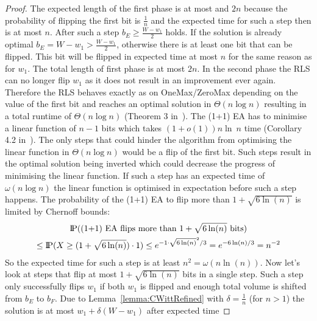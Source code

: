 \begin{proof}
    The expected length of the first phase is at most
    and $2n$ because the probability of flipping the first bit is $\frac{1}{n}$ and the expected time for such a step then is at most $n$.
    After such a step $b_E \ge \frac {W-w_1}{2}$ holds.
    If the solution is already optimal $b_E = W-w_1>\frac {W-w_1}{2}$, otherwise there is at least one bit that can be flipped.
    This bit will be flipped in expected time at most $n$ for the same reason as for $w_1$.
    The total length of first phase is at most $2n$.
    In the second phase the RLS can no longer flip $w_1$ as it does not result in an improvement ever again.
    Therefore the RLS behaves exactly as on OneMax/ZeroMax depending on the value of the first bit and reaches an optimal solution in $\Theta(n\log{}n)$ resulting in a total runtime of $\Theta(n\log{}n)$ (Theorem 3 in~\cite{witt2014fitness}).\newline
    The (1+1) EA has to minimise a linear function of $n-1$ bits which takes $(1+o(1))n\ln~n$ time (Corollary 4.2 in~\cite{witt2013tight}).
    The only steps that could hinder the algorithm from optimising the linear function in $\Theta(n\log{}n)$ would be a flip of the first bit.
    Such steps result in the optimal solution being inverted which could decrease the progress of minimising the linear function.
    If such a step has an expected time of $\omega(n\log{}n)$ the linear function is optimised in expectation before such a step happens.
    The probability of the (1+1) EA to flip more than $1+\sqrt{6\ln(n)}$ is limited by Chernoff bounds:
    \begin{gather}
        \nonumber \text{I\kern-0.15em P}(\text{(1+1) EA flips more than }1+\sqrt{6\ln(n)}\text{ bits})\\ \nonumber
        \le\text{I\kern-0.15em P}(X\ge (1+\sqrt{6\ln(n)})\cdot 1)
        \le e^{-1\cdot{\sqrt{6\ln(n)}}^2/3}
        = e^{-6\ln(n)/3}
        = n^{-2}
    \end{gather}
    So the expected time for such a step is at least \(n^2=\omega(n\ln(n))\).
    Now let's look at steps that flip at most $1+\sqrt{6\ln(n)}$ bits in a single step.
    Such a step only successfully flips $w_1$ if both $w_1$ is flipped and enough total volume is shifted from $b_E$ to $b_F$.
    Due to Lemma~\ref{lemma:CWittRefined} with $\delta=\frac{1}{n}$ (for $n>1$) the solution is at most $w_1+\delta(W-w_1)$ after expected time

\end{proof}

